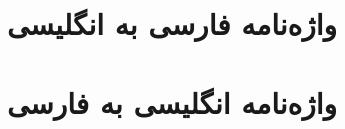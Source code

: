 \documentclass[12pt]{report}
\begin{document}


\newpage
\pagestyle{plain}
\setcounter{page}{1}


\tableofcontents

\newpage
\pagestyle{plain}
\setcounter{page}{1}



\chapter*{واژه‌نامه فارسی به انگلیسی}
\chapter*{ واژه‌نامه انگلیسی به فارسی}




\newpage

\end{document}
